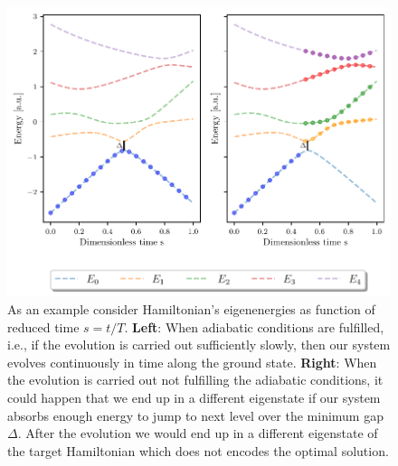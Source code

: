 \begin{figure}[H]
    \centering
    \includegraphics[width=\textwidth]{Figures/Eigenenergies.pdf}
    \caption{As an example consider Hamiltonian's eigenenergies as function of reduced time $s=t/T$. \textbf{Left}: When adiabatic conditions are fulfilled, i.e., if the evolution is carried out sufficiently slowly, then our system evolves continuously in time along the ground state. \textbf{Right}: When the evolution is carried out not fulfilling the adiabatic conditions, it could happen that we end up in a different eigenstate if our system absorbs enough energy to jump to next level over the minimum gap $\Delta$. After the evolution we would end up in a different eigenstate of the target Hamiltonian which does not encodes the optimal solution.}
    \label{fig:Eigenenergies}
\end{figure}
